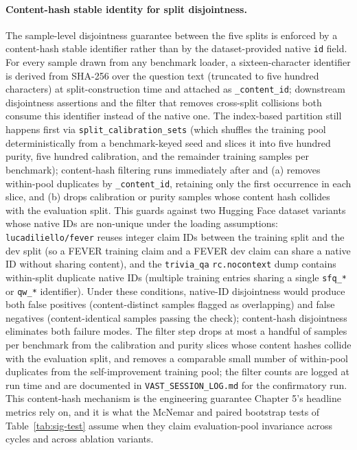 \paragraph{Content-hash stable identity for split disjointness.}
\label{par:content-hash-disjointness}
The sample-level disjointness guarantee between the five splits is
enforced by a content-hash stable identifier rather than by the
dataset-provided native \texttt{id} field. For every sample drawn
from any benchmark loader, a sixteen-character identifier is derived
from SHA-256 over the question text (truncated to five hundred
characters) at split-construction time and attached as
\texttt{\_content\_id}; downstream disjointness assertions and the
filter that removes cross-split collisions both consume this
identifier instead of the native one. The index-based partition
still happens first via \texttt{split\_calibration\_sets} (which
shuffles the training pool deterministically from a benchmark-keyed
seed and slices it into five hundred purity, five hundred
calibration, and the remainder training samples per benchmark);
content-hash filtering runs immediately after and (a) removes
within-pool duplicates by \texttt{\_content\_id}, retaining only the
first occurrence in each slice, and (b) drops calibration or purity
samples whose content hash collides with the evaluation split.
This guards against two Hugging Face dataset variants whose native
IDs are non-unique under the loading assumptions:
\texttt{lucadiliello/fever} reuses integer claim IDs between the
training split and the dev split (so a FEVER training claim and a
FEVER dev claim can share a native ID without sharing content),
and the \texttt{trivia\_qa} \texttt{rc.nocontext} dump contains
within-split duplicate native IDs (multiple training entries
sharing a single \texttt{sfq\_*} or \texttt{qw\_*} identifier).
Under these conditions, native-ID disjointness would produce both
false positives (content-distinct samples flagged as overlapping)
and false negatives (content-identical samples passing the check);
content-hash disjointness eliminates both failure modes. The
filter step drops at most a handful of samples per benchmark from
the calibration and purity slices whose content hashes collide with
the evaluation split, and removes a comparable small number of
within-pool duplicates from the self-improvement training pool;
the filter counts are logged at run time and are documented in
\texttt{VAST\_SESSION\_LOG.md} for the confirmatory run. This
content-hash mechanism is the engineering guarantee Chapter 5's
headline metrics rely on, and it is what the McNemar and paired
bootstrap tests of Table~\ref{tab:sig-test} assume when they claim
evaluation-pool invariance across cycles and across ablation
variants.

